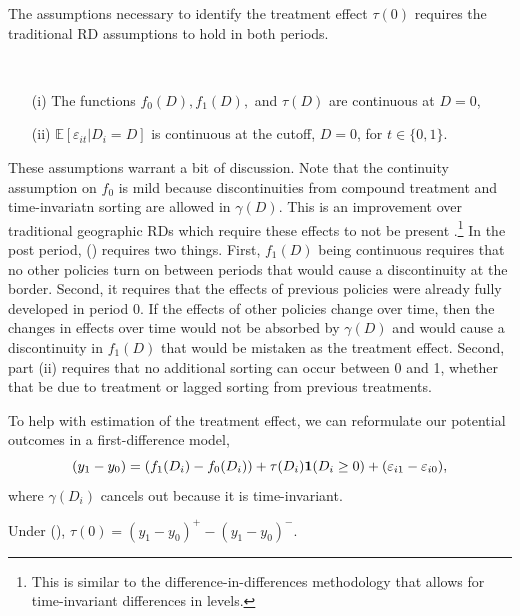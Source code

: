 \documentclass[12pt]{article}
\begin{document}
The assumptions necessary to identify the treatment effect $\tau(0)$ requires the traditional RD assumptions to hold in both periods.

\begin{assumption}\label{eq:continuity_panel}\ \\\vspace{-10mm} 
    \begin{itemize}
        \item[(i)] The functions $f_0(D), f_1(D),$ and $\tau(D)$ are continuous at $D = 0$, 
        \item[(ii)] $\mathbb{E}\left[ \varepsilon_{it} \vert D_i = D \right]$ is continuous at the cutoff, $D = 0$, for $t \in \{0, 1\}$. 
    \end{itemize}
\end{assumption}

These assumptions warrant a bit of discussion. Note that the continuity assumption on $f_0$ is mild because discontinuities from compound treatment and time-invariatn sorting are allowed in $\gamma(D)$. This is an improvement over traditional geographic RDs which require these effects to not be present \citep{Keele_Titiunik_2015}.\footnote{This is similar to the difference-in-differences methodology that allows for time-invariant differences in levels.} In the post period, () requires two things. First, $f_1(D)$ being continuous requires that no other policies turn on between periods that would cause a discontinuity at the border. Second, it requires that the effects of previous policies were already fully developed in period 0. If the effects of other policies change over time, then the changes in effects over time would not be absorbed by $\gamma(D)$ and would cause a discontinuity in $f_1(D)$ that would be mistaken as the treatment effect. Second, part (ii) requires that no additional sorting can occur between 0 and 1, whether that be due to treatment or lagged sorting from previous treatments.

To help with estimation of the treatment effect, we can reformulate our potential outcomes in a first-difference model, $$
    (y_1 - y_0) = (f_1(D_i) - f_0(D_i)) + \tau(D_i)\mathbf{1}(D_i \geq 0) + (\varepsilon_{i1} - \varepsilon_{i0}),
$$
where $\gamma(D_i)$ cancels out because it is time-invariant. 

\begin{theorem}
    Under (), $\tau(0) = (y_1 - y_0)^+ - (y_1 - y_0)^-$.
\end{theorem}
\end{document}
